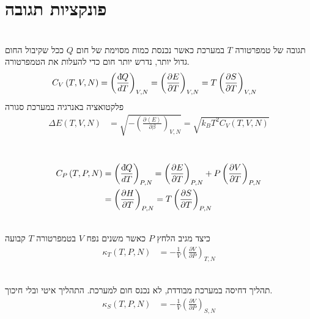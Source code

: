 \section{פונקציות תגובה}
\begin{cheatformula}\\
תגובה של טמפרטורה $T$ במערכת כאשר נכנסת כמות מסוימת של חום $Q$
ככל שקיבול החום גדול יותר, נדרש יותר חום כדי להעלות את הטמפרטורה.
    \begin{align*}
        C_V\left(T,V,N\right) &= \left( \frac{\mathrm{d}\hspace*{-0.1405em}\bar{}\hspace*{0.1em} Q}{dT} \right)_{V,N} = \left( \frac{\partial E}{\partial T} \right)_{V,N} = T \left( \frac{\partial S}{\partial T} \right)_{V,N} 
    \end{align*}
פלקטואציה באנרגיה במערכת סגורה
\begin{align*}
    \Delta E\left( T,V,N \right) &= \sqrt{-\left( \frac{\partial \left< E \right>}{\partial \beta }\right)_{V,N}} = \sqrt{k_B T^2 C_V\left(T,V,N\right)}
\end{align*}
\end{cheatformula}

\begin{cheatformula}\\
    \begin{align*}
        C_P\left(T,P,N\right) &= \left( \frac{\mathrm{d}\hspace*{-0.1405em}\bar{}\hspace*{0.1em} Q}{dT} \right)_{P,N} = \left( \frac{\partial E}{\partial T} \right)_{P,N} 
        + P \left( \frac{\partial V}{\partial T} \right)_{P,N} \\
        &= \left( \frac{\partial H}{\partial T} \right)_{P,N} = T \left( \frac{\partial S}{\partial T} \right)_{P,N} 
    \end{align*}
\end{cheatformula}


\begin{cheatformula}\\
כיצד מגיב הלחץ $P$ כאשר משנים נפח $V$ בטמפרטורה $T$ קבועה
    \begin{align*}
        \kappa_T\left(T,P,N\right) &= - \frac{1}{V} \left( \frac{\partial V}{\partial P} \right)_{T,N}
    \end{align*}
\end{cheatformula}


\begin{cheatformula}\\
תהליך דחיסה במערכת מבודדת, לא נכנס חום למערכת. התהליך איטי ובלי חיכוך.
    \begin{align*}
        \kappa_S\left(T,P,N\right) &= - \frac{1}{V} \left( \frac{\partial V}{\partial P} \right)_{S,N}
    \end{align*}
\end{cheatformula}


